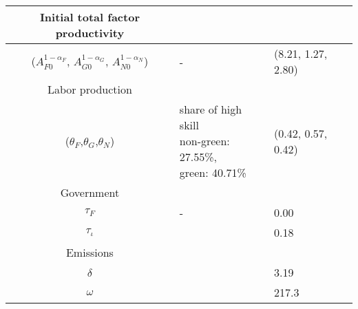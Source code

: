 \begin{table}[h!]
\begin{center}
{\begin{tabular}{c|ll}
 			\hline
 			Initial total factor productivity&\multicolumn{2}{c}{}\\
 			\hline
 			($A_{F0}^{1-\alpha_F}$, $A_{G0}^{1-\alpha_G}$, $A_{N0}^{1-\alpha_N}$)&- &(8.21, 1.27, 2.80)  \\
 			\hline 
 				Labor production&\multicolumn{2}{c}{}\\ 			
 			\hline
 			($\theta_F$,$\theta_G$,$\theta_N$)&\makecell[l]{share of high skill\\ non-green: 27.55\%,\\ green: 40.71\% \citep{Consoli2016DoCapital} }& (0.42, 0.57, 0.42)\\
 			\hline
 			Government&\multicolumn{2}{c}{}\\
 			\hline
 			$\tau_F$&- &0.00\\
 			$\tau_{\iota}$&\cite{Heathcote2017OptimalFramework} &0.18\\
 			\hline
 			Emissions&\multicolumn{2}{c}{}\\
 			\hline
 			$\delta$& \makecell[l]{\cite{EPAems}}&3.19\\
 			$\omega$& \cite{EPAems}&217.3\\
 			\hline \hline
 		\end{tabular}	}
 	\end{center}
 \end{table}
 
 
 
 




